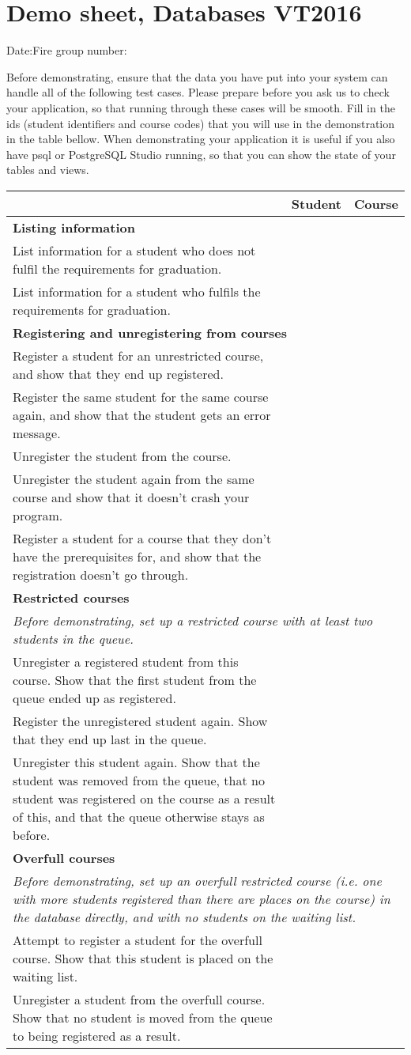 \documentclass[10pt]{article}
\begin{document}
\newcommand{\s}[1]{
  \multicolumn{3}{|l|}{\textbf{#1}} \\\hline
}

\newcommand{\h}[1]{
  \multicolumn{3}{|p{11cm}|}{\textit{#1}} \\\hline
}
\newcommand{\f}[1]{
  #1 &&\\\hline
}
\small

\section*{Demo sheet, Databases VT2016}

\vfill
Date:\makebox[3cm]{\dotfill}\hfill  Fire group number: \makebox[3cm]{\dotfill}

Before demonstrating, ensure that the data you have put into your system can
handle all of the following test cases. Please prepare before you ask us to
check your application, so that running through these cases will be smooth.
Fill in the ids (student identifiers and course codes) that you will use in the
demonstration in the table bellow. When demonstrating your application it is
useful if you also have psql or PostgreSQL Studio running, so that you can show
the state of your tables and views.

\vfill

\begin{tabular}{|p{7cm}|p{2cm}|p{2cm}|}
\hline & Student & Course \\ \hline
\s{Listing information}
\f{List information for a student who does not fulfil the requirements for graduation.}
\f{List information for a student who fulfils the requirements for graduation.}
\s{Registering and unregistering from courses}
\f{Register a student for an unrestricted course, and show that they end up registered.}
\f{Register the same student for the same course again, and show that the student gets an error message.}
\f{Unregister the student from the course.}
\f{Unregister the student again from the same course and show that it doesn't crash your program.}
\f{Register a student for a course that they don't have the prerequisites for, and show that the registration doesn't go through.}
\s{Restricted courses}
\h{Before demonstrating, set up a restricted course with at least two students in the queue.}
\f{Unregister a registered student from this course. Show that the first student from the queue ended up as registered.}
\f{Register the unregistered student again. Show that they end up last in the queue.}
\f{Unregister this student again. Show that the student was removed from the queue, that no student was registered on the course as a result of this, and that the queue otherwise stays as before.}
\s{Overfull courses}
\h{Before demonstrating, set up an overfull restricted course (i.e. one with more students registered than there are places on the course) in the database directly, and with no students on the waiting list.}
\f{Attempt to register a student for the overfull course. Show that this student is placed on the waiting list.}
\f{Unregister a student from the overfull course. Show that no student is moved from the queue to being registered as a result.}
\end{tabular}
\end{document}
